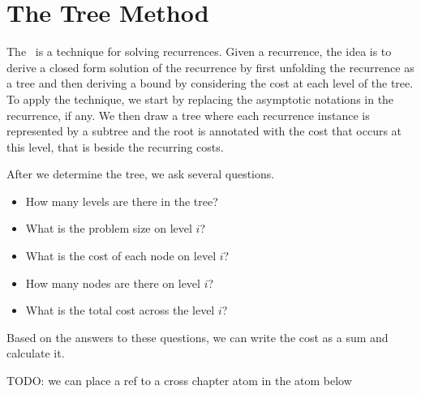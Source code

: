 \section{The Tree Method}
\label{sec:analysis::recurrences::tree-method}

\begin{cluster}
\label{grp:def:analysis::recurrences::tree-method}

\begin{definition}
\label{def:analysis::recurrences::tree-method}
The~ is a technique for solving recurrences.
Given a recurrence, the idea is to derive a closed form solution of
the recurrence by first unfolding the recurrence as a tree and then
deriving a bound by considering the cost at each level of the tree.
To apply the technique, we start by replacing the asymptotic notations
in the recurrence, if any.
We then draw a tree where each recurrence instance is represented by a
subtree and the root is annotated with the cost that occurs at this
level, that is beside the recurring costs. 

After we determine the tree, we ask several questions.
\begin{itemize}
\item How many levels are there in the tree?
\item What is the problem size on level $i$?
\item What is the cost of each node on level $i$?
\item How many nodes are there on level $i$?
\item What is the total cost across the level $i$?
\end{itemize}

Based on the answers to these questions, we can write the cost as a
sum and calculate it.

\end{definition}
\end{cluster}

\begin{cluster}
\label{grp:tch:analysis::recurrences::todo}

\begin{teachnote}
\label{tch:analysis::recurrences::todo}
TODO: we can place a ref to a cross chapter atom in the atom below

\end{teachnote}
\end{cluster}

